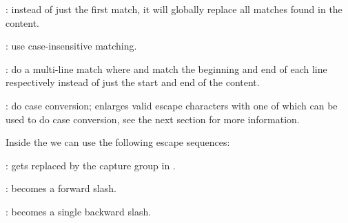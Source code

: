 \documentclass{book}
\begin{document}
\begin{mdUl}[class={list-star,compact},data-line={2853}]%
\begin{mdLi}[data-line={2853}]%
{}%
{}: instead of just the first match, it will globally replace all matches found in the content.%
\end{mdLi}%
\begin{mdLi}[data-line={2854}]%
{}%
{}: use case-insensitive matching.%
\end{mdLi}%
\begin{mdLi}[data-line={2855}]%
{}%
{}: do a multi-line match where %
{}\mdCode[class={code,code1}]{{\textasciicircum}}%
{} and %
{}\mdCode[class={code,code1}]{\$}%
{} match the beginning and end of each line respectively
  instead of just the start and end of the content.%
\end{mdLi}%
\begin{mdLi}[data-line={2857}]%
{}%
{}: do case conversion; enlarges valid escape characters with one of %
{}%
{} which can be
  used to do case conversion, see the next section for more information.%
\end{mdLi}%
\end{mdUl}%
\begin{mdP}[class={para-continue},data-line={2862}]%
{}Inside the %
{}%
{} we can use the following escape sequences:%
\end{mdP}%
\begin{mdUl}[class={list-star,compact},data-line={2864}]%
\begin{mdLi}[data-line={2864}]%
{}\mdCode[class={code,code1}]{{\textbackslash}}%
{}%
{}: gets replaced by the %
{}%
{} capture group in %
{}%
{}.%
\end{mdLi}%
\begin{mdLi}[data-line={2865}]%
{}\mdCode[class={code,code1}]{{\textbackslash}/}%
{}: becomes a forward slash.%
\end{mdLi}%
\begin{mdLi}[data-line={2866}]%
{}\mdCode[class={code,code1}]{{\textbackslash}{\textbackslash}}%
{}: becomes a single backward slash.%
\end{mdLi}%
\end{mdUl}%
\end{document}
